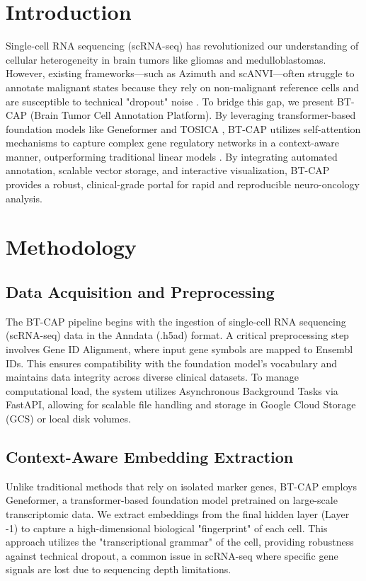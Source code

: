 \documentclass[conference]{IEEEtran}
\begin{document}
\section{Introduction}
Single-cell RNA sequencing (scRNA-seq) has revolutionized our understanding of cellular heterogeneity in brain tumors like gliomas and medulloblastomas. However, existing frameworks—such as Azimuth and scANVI—often struggle to annotate malignant states because they rely on non-malignant reference cells and are susceptible to technical "dropout" noise \cite{CHAUHAN2025100371}. To bridge this gap, we present BT-CAP (Brain Tumor Cell Annotation Platform). By leveraging transformer-based foundation models like Geneformer \cite{theodoris2023transfer} and TOSICA \cite{chen2023transformer}, BT-CAP utilizes self-attention mechanisms to capture complex gene regulatory networks in a context-aware manner, outperforming traditional linear models \cite{szalata2024transformers}. By integrating automated annotation, scalable vector storage, and interactive visualization, BT-CAP provides a robust, clinical-grade portal for rapid and reproducible neuro-oncology analysis.

\section{Methodology}

\subsection{Data Acquisition and Preprocessing}
The BT-CAP pipeline begins with the ingestion of single-cell RNA sequencing (scRNA-seq) data in the Anndata (.h5ad) format. A critical preprocessing step involves Gene ID Alignment, where input gene symbols are mapped to Ensembl IDs. This ensures compatibility with the foundation model's vocabulary and maintains data integrity across diverse clinical datasets. To manage computational load, the system utilizes Asynchronous Background Tasks via FastAPI, allowing for scalable file handling and storage in Google Cloud Storage (GCS) or local disk volumes.

\subsection{Context-Aware Embedding Extraction}
Unlike traditional methods that rely on isolated marker genes, BT-CAP employs Geneformer, a transformer-based foundation model pretrained on large-scale transcriptomic data. We extract embeddings from the final hidden layer (Layer -1) to capture a high-dimensional biological "fingerprint" of each cell. This approach utilizes the "transcriptional grammar" of the cell, providing robustness against technical dropout, a common issue in scRNA-seq where specific gene signals are lost due to sequencing depth limitations.
\end{document}
